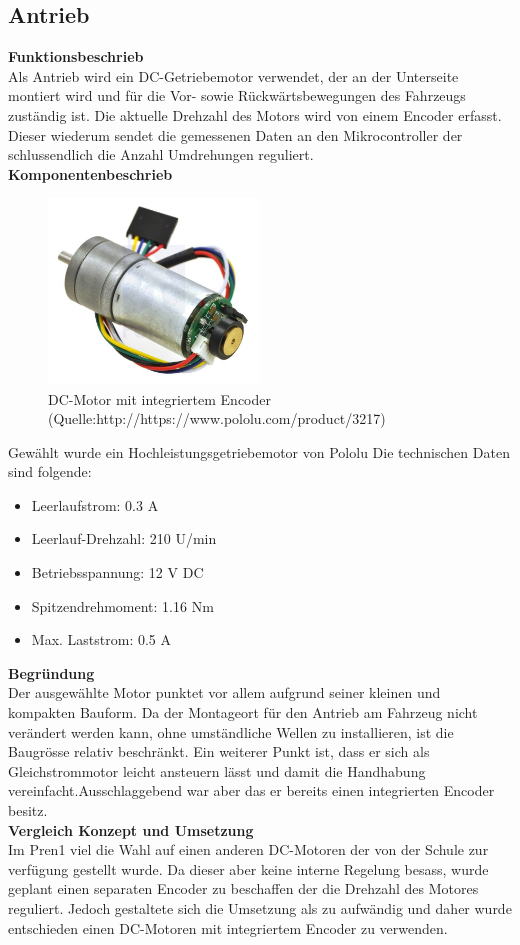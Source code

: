 \subsection{Antrieb}
\textbf{Funktionsbeschrieb}\\[0.2cm]
Als Antrieb wird ein DC-Getriebemotor verwendet, der an der Unterseite montiert wird und für die Vor- sowie Rückwärtsbewegungen des Fahrzeugs zuständig ist.
Die aktuelle Drehzahl des Motors wird von einem Encoder erfasst. Dieser wiederum sendet die gemessenen Daten an den Mikrocontroller der schlussendlich die Anzahl Umdrehungen reguliert.\\[0.2cm]
\textbf{Komponentenbeschrieb}
\begin{figure}[H]
\centering
\includegraphics[width=0.5\textwidth]{03_Loesungskonzept/pictures/Antrieb_Encoder.jpg}
\caption{DC-Motor mit integriertem Encoder (Quelle:http://https://www.pololu.com/product/3217)}	
\end{figure}
Gewählt wurde ein Hochleistungsgetriebemotor von Pololu
Die technischen Daten sind folgende:
\begin{itemize}
\item Leerlaufstrom: 0.3 A
\item Leerlauf-Drehzahl: 210 U/min
\item Betriebsspannung: 12 V DC
\item Spitzendrehmoment: 1.16 Nm
\item Max. Laststrom: 0.5 A
\end{itemize}
\textbf{Begründung}\\[0.2cm]
Der ausgewählte Motor punktet vor allem aufgrund seiner kleinen und kompakten Bauform. Da der Montageort für den Antrieb am Fahrzeug nicht verändert werden kann, ohne umständliche Wellen zu installieren, ist die Baugrösse relativ beschränkt.
Ein weiterer Punkt ist, dass er sich als Gleichstrommotor leicht ansteuern lässt und damit die Handhabung vereinfacht.Ausschlaggebend war aber das er bereits einen integrierten Encoder besitz.\\[0.2cm]
\textbf{Vergleich Konzept und Umsetzung}\\[0.2cm]
Im Pren1 viel die Wahl auf einen anderen DC-Motoren der von der Schule zur verfügung gestellt wurde. Da dieser aber keine interne Regelung besass, wurde geplant einen separaten Encoder zu beschaffen der die Drehzahl des Motores reguliert. Jedoch gestaltete sich die Umsetzung als zu aufwändig und daher wurde entschieden einen DC-Motoren mit integriertem Encoder zu verwenden.
